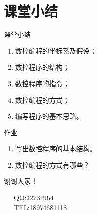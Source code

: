 \documentclass[UTF8,zihao=-4]{ctexbeamer}
\begin{document}
\section*{课堂小结}
\begin{frame}{课堂小结}
\begin{enumerate}
    \item 数控编程的坐标系及假设；
    \item 数控程序的结构；
    \item 数控程序的指令；
    \item 数控编程的方式；
    \item 编写程序的基本思路。
\end{enumerate}
\end{frame}

\begin{frame}{作业}
\begin{enumerate}
    \item 写出数控程序的基本结构。
    \item 数控编程的方式有哪些？
\end{enumerate}
\end{frame}

\begin{frame}[plain]
\vfill

\centering \huge 谢谢大家！

\vfill

\flushleft \footnotesize   
~~~QQ:32731964\\
~~~TEL:18974681118\\

\end{frame}
\end{document}
